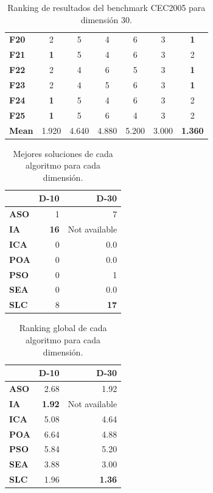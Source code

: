 \begin{table}
{\begin{tabular}{lcccccc}
		\textbf{F20}  &      2 &      5 &      4 &      6 &      3 &      \textbf{1} \\
		\textbf{F21}  &      \textbf{1} &      5 &      4 &      6 &      3 &      2 \\
		\textbf{F22}  &      2 &      4 &      6 &      5 &      3 &      \textbf{1} \\
		\textbf{F23}  &      2 &      4 &      5 &      6 &      3 &      \textbf{1} \\
		\textbf{F24}  &      \textbf{1} &      5 &      4 &      6 &      3 &      2 \\
		\textbf{F25}  &      \textbf{1} &      5 &      6 &      4 &      3 &      2 \\
		\midrule
		\textbf{Mean} &  1.920 &  4.640 &  4.880 &  5.200 &  3.000 &  \textbf{1.360} \\
		\bottomrule
	\end{tabular}}
	\caption{Ranking de resultados del benchmark CEC2005 para dimensión 30.}
\end{table}

\begin{table}
	\centering
	\begin{tabular}{lrr}
		\toprule
		{} &  \textbf{D-10} &   \textbf{D-30} \\
		\midrule
		\textbf{ASO} &   1 &   7 \\
		\textbf{IA}  &  \textbf{16} &   Not available \\
		\textbf{ICA} &   0 &   0.0 \\
		\textbf{POA} &   0 &   0.0 \\
		\textbf{PSO} &   0 &   1 \\
		\textbf{SEA} &   0 &   0.0 \\
		\textbf{SLC} &   8 &  \textbf{17} \\
		\bottomrule
	\end{tabular}
	\caption{Mejores soluciones de cada algoritmo para cada dimensión.}
\end{table}

\begin{table}
	\centering
	\begin{tabular}{lrr}
		\toprule
		{} &    \textbf{D-10} &    \textbf{D-30} \\
		\midrule
		\textbf{ASO} &  2.68 &  1.92 \\
		\textbf{IA}  &  \textbf{1.92} &   Not available \\
		\textbf{ICA} &  5.08 &  4.64 \\
		\textbf{POA} &  6.64 &  4.88 \\
		\textbf{PSO} &  5.84 &  5.20 \\
		\textbf{SEA} &  3.88 &  3.00 \\
		\textbf{SLC} &  1.96 &  \textbf{1.36} \\
		\bottomrule
	\end{tabular}
	\caption{Ranking global de cada algoritmo para cada dimensión.}
\end{table}